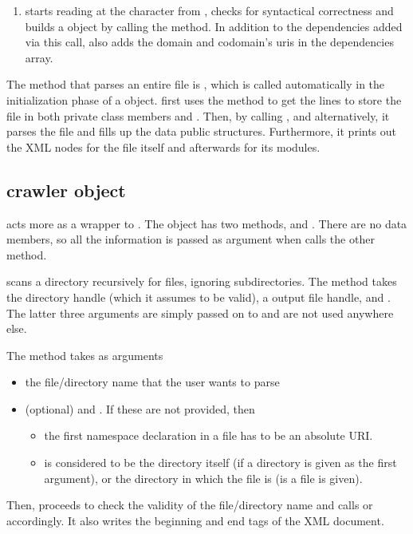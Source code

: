 \begin{enumerate}
\item {} starts reading at the \ttt{\%} character from , checks for syntactical correctness and builds a  object by calling the  method. In addition to the dependencies added via this call,  also adds the domain and codomain's uris in the dependencies array.
\end{enumerate}

The method that parses an entire file is , which is called automatically in the initialization phase of a  object.  first uses the method  to get the lines to store the file in both private class members  and . Then, by calling ,  and  alternatively, it parses the file and fills up the data public structures. Furthermore, it prints out the XML nodes for the file itself and afterwards for its modules.


\subsection{crawler object}

 acts more as a wrapper to . The object has two methods,  and . There are no data members, so all the information is passed as argument when  calls the other method. 

 scans a directory recursively for  files, ignoring  subdirectories. The method takes the directory handle (which it assumes to be valid), a output file handle,  and . The latter three arguments are simply passed on to  and are not used anywhere else. 

The  method takes as arguments 
\begin{itemize}
\item the file/directory name that the user wants to parse
\item (optional)  and . If these are not provided, then
	\begin{itemize}
	\item the first namespace declaration in a file has to be an absolute URI.
	\item {} is considered to be the directory itself (if a directory is given as the first argument), or the directory in which the file is (is a file is given). 
	\end{itemize}
\end{itemize}
Then,  proceeds to check the validity of the file/directory name and calls  or  accordingly. It also writes the beginning and end tags of the XML document.



